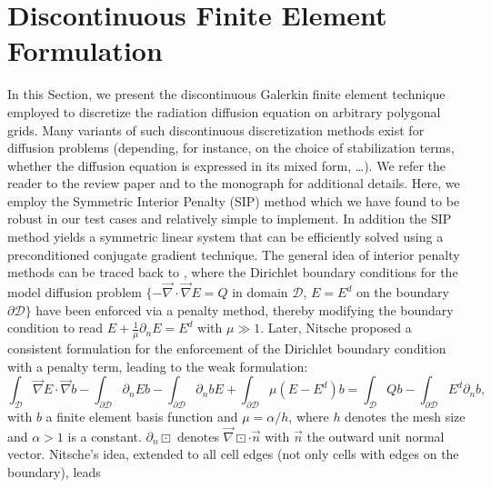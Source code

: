 \documentclass[preprint,10pt]{elsarticle}
\renewcommand{\div}{\vec{\nabla}\! \cdot \!}
\newcommand{\grad}{\vec{\nabla}}
\newcommand{\D}{\mathcal{D}}
\newcommand{\vn}{\vec{n}}
\newcommand{\tf}{b}
\begin{document}
\section{Discontinuous Finite Element Formulation} \label{sec:ip}

In this Section, we present the discontinuous Galerkin finite element technique employed to
discretize the radiation diffusion equation on arbitrary polygonal grids. Many variants of such discontinuous discretization
methods exist for diffusion problems (depending, for instance, on the choice of stabilization terms, whether 
the diffusion equation is expressed in its mixed form, \ldots). We refer the reader to the review
paper \cite{DouglasN.Arnold2002} and to the monograph \cite{Riviere2008} for additional details. Here, we employ the Symmetric
Interior Penalty (SIP) method which we have found to be robust in our test cases and relatively simple 
to implement. In addition the SIP method yields a symmetric linear system that can be efficiently solved using
a preconditioned conjugate gradient technique.
The general idea of interior penalty methods can be traced back to \cite{lions1968}, where the Dirichlet
boundary conditions for the model diffusion problem $\{-\div \grad E = Q$ in domain $\D$, $E=E^d$ on 
the boundary $\partial \D\}$ have been enforced via a penalty method, thereby modifying the 
boundary condition to read $E+\frac{1}{\mu}\partial_n E = E^d$ with $\mu\gg 1$. Later, 
Nitsche \cite{nitsche1971} proposed a consistent formulation for the enforcement of the 
Dirichlet boundary condition with a penalty term, leading to the weak formulation:
\begin{equation}
\label{eq:penalty_nitsche_bd_only}
\int_{\D} \grad E \cdot \grad \tf
- \int_{\partial\D} \partial_n E \tf  
- \int_{\partial\D} \partial_n \tf E 
+ \int_{\partial\D} \mu(E-E^d) \tf 
=
\int_{\D} Q \tf 
- \int_{\partial\D} E^d \partial_n \tf ,
\end{equation}
with $\tf$ a finite element basis function and $\mu=\alpha/h$, where $h$ denotes 
the mesh size and $\alpha>1$ is a constant. $\partial_n \boxdot$ denotes $ \grad \boxdot \cdot \vn$ with $\vn$ the outward unit normal vector.
%
Nitsche's idea, extended to all cell edges (not only cells with edges on the boundary), leads
\end{document}
